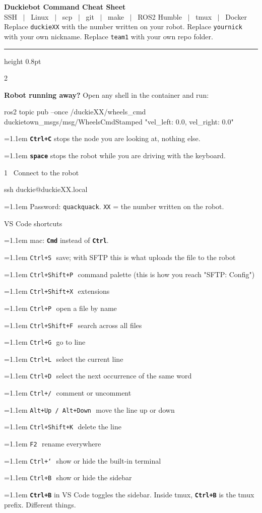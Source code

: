 \documentclass[10pt,a4paper]{extarticle}
\newcommand{\code}[1]{\textcolor{accentd}{\texttt{#1}}}
\newcommand{\key}[1]{\textcolor{robotc}{\texttt{\textbf{#1}}}}
\newcommand{\ce}[2]{\par\hangindent=1.1em\hangafter=1
  \code{#1}\,\textcolor{dim}{\small\textemdash\ #2}\par\vspace{0.5pt}}
\newcommand{\nt}[1]{\par\hangindent=1.1em\hangafter=1
  \textcolor{dim}{\small #1}\par\vspace{0.5pt}}
\begin{document}
\begin{center}
{\sffamily\bfseries\Large\color{accent} Duckiebot Command Cheat Sheet}\\[2pt]
{\sffamily\footnotesize\color{dim} SSH \ $|$ \ Linux \ $|$ \ scp \ $|$ \ git \ $|$ \ make \ $|$ \ ROS2 Humble \ $|$ \ tmux \ $|$ \ Docker}\\[3pt]
{\footnotesize Replace \code{duckieXX} with the number written on your robot. Replace \code{yournick} with your own nickname. Replace \code{team1} with your own repo folder.}
\end{center}
\vspace{2pt}
{\color{accent!55}\hrule height 0.8pt}
\vspace{4pt}

\begin{multicols}{2}
\raggedcolumns

\begin{stopbox}
{\bfseries Robot running away?} Open any shell in the container and run:
\begin{cmdred}
ros2 topic pub --once /duckieXX/wheels_cmd duckietown_msgs/msg/WheelsCmdStamped "{vel_left: 0.0, vel_right: 0.0}"
\end{cmdred}
\vspace{2pt}
\nt{\key{Ctrl+C} stops the node you are looking at, nothing else.}
\nt{\key{space} stops the robot while you are driving with the keyboard.}
\end{stopbox}

\begin{sect}{1 \ Connect to the robot}
\begin{cmd}
ssh duckie@duckieXX.local
\end{cmd}
\nt{Password: \code{quackquack}. \code{XX} = the number written on the robot.}
\end{sect}

\begin{sect}{VS Code shortcuts}
\nt{mac: \key{Cmd} instead of \key{Ctrl}.}
\ce{Ctrl+S}{save; with SFTP this is what uploads the file to the robot}
\ce{Ctrl+Shift+P}{command palette (this is how you reach "SFTP: Config")}
\ce{Ctrl+Shift+X}{extensions}
\ce{Ctrl+P}{open a file by name}
\ce{Ctrl+Shift+F}{search across all files}
\ce{Ctrl+G}{go to line}
\ce{Ctrl+L}{select the current line}
\ce{Ctrl+D}{select the next occurrence of the same word}
\ce{Ctrl+/}{comment or uncomment}
\ce{Alt+Up / Alt+Down}{move the line up or down}
\ce{Ctrl+Shift+K}{delete the line}
\ce{F2}{rename everywhere}
\ce{Ctrl+`}{show or hide the built-in terminal}
\ce{Ctrl+B}{show or hide the sidebar}
\nt{\key{Ctrl+B} in VS Code toggles the sidebar. Inside tmux, \key{Ctrl+B} is the tmux prefix. Different things.}
\end{sect}


\end{multicols}
\end{document}

